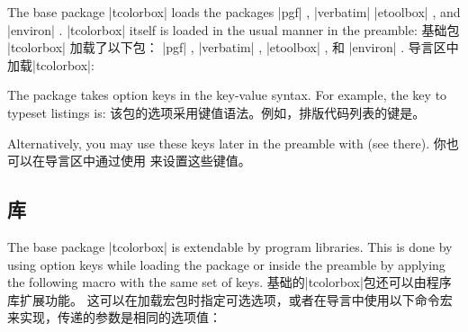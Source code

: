 \begin{stripedbox}
The base package |tcolorbox| loads the packages
|pgf| %
, |verbatim| %
|etoolbox| %
, and |environ| %
.
|tcolorbox| itself is loaded in the usual manner in the preamble:
\tcblower
基础包 |tcolorbox| 加载了以下包：
|pgf| ,%
|verbatim| ,%
|etoolbox| ,%
和 |environ| .%
% 
导言区中加载|tcolorbox|:
\end{stripedbox}

\begin{dispListing}
\usepackage{tcolorbox}
\end{dispListing}


\begin{stripedbox}
The package takes option keys in the key-value syntax.%
For example, the key to typeset listings is:
\tcblower
该包的选项采用键值语法。例如，排版代码列表的键是。
\end{stripedbox}


\begin{dispListing}
\usepackage[listings]{tcolorbox}
\end{dispListing}

\begin{stripedbox}
Alternatively, you may use these keys later in the preamble with  (see there).
\tcblower
你也可以在导言区中通过使用  来设置这些键值。%
\end{stripedbox}


\subsection{库}\label{sec:bibliothek}

\begin{stripedbox}
The base package |tcolorbox| is extendable by program libraries.%
This is done by using option keys while loading the package or inside
the preamble by applying the following macro with the same set of keys.
\tcblower
基础的|tcolorbox|包还可以由程序库扩展功能。%
这可以在加载宏包时指定可选选项，或者在导言中使用以下命令宏来实现，传递的参数是相同的选项值：
\end{stripedbox}

